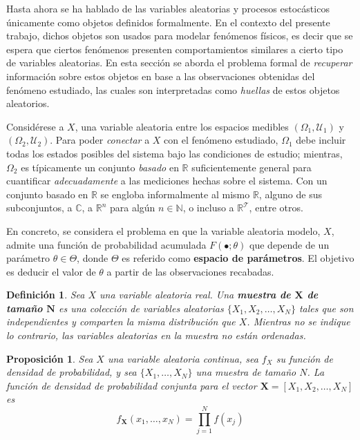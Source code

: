 \documentclass[12pt,letterpaper]{book}
\newtheorem{definicion}{Definición}[chapter]
\newtheorem{proposicion}[teorema]{Proposición}
\newcommand{\R}{\mathbb{R}}
\newcommand{\C}{\mathbb{C}}
\newcommand{\N}{\mathbb{N}}
\begin{document}
Hasta ahora se ha hablado de las variables aleatorias y procesos estocásticos únicamente como objetos definidos formalmente.
%
En el contexto del presente trabajo, dichos objetos son usados para modelar fenómenos físicos, es decir que se espera que ciertos fenómenos presenten comportamientos similares a cierto tipo de variables aleatorias.
%
En esta sección se aborda el problema formal de \textit{recuperar} información sobre estos objetos en base a las observaciones obtenidas del fenómeno estudiado, las cuales son interpretadas como \textit{huellas} de estos objetos aleatorios.

Considérese a $X$, una variable aleatoria entre los espacios medibles $(\Omega_1,\mathcal{U}_1)$ y $(\Omega_2,\mathcal{U}_2)$. 
%
Para poder \textit{conectar} a $X$ con el fenómeno estudiado, $\Omega_1$ debe incluir todas los estados posibles del sistema bajo las condiciones de estudio; mientras, $\Omega_2$ es típicamente un conjunto \textit{basado} en $\R$ suficientemente general para cuantificar \textit{adecuadamente} a las mediciones hechas sobre el sistema.
%
Con un conjunto basado en $\R$ se engloba informalmente al mismo $\R$, alguno de sus subconjuntos, a $\C$, a $\R^n$ para algún $n\in \N$, o incluso a $\R^\mathcal{T}$, entre otros.

En concreto, se considera el problema en que la variable aleatoria modelo, $X$, admite una función de probabilidad acumulada $F(\bullet; \theta)$ que depende de un parámetro $\theta \in \Theta$, donde $\Theta$ es referido como \textbf{espacio de parámetros}.
%
El objetivo es deducir el valor de $\theta$ a partir de las observaciones recabadas.

\begin{definicion}
Sea $X$ una variable aleatoria real. Una \textbf{muestra de $\boldsymbol{X}$ de tamaño $\boldsymbol{N}$} es una colección de variables aleatorias $\{ X_1, X_2, \dots, X_N \}$ tales que son independientes y comparten la misma distribución que $X$.
%
Mientras no se indique lo contrario, las variables aleatorias en la muestra no están ordenadas.
\end{definicion}

\begin{proposicion}
Sea $X$ una variable aleatoria continua, sea $f_X$ su función de densidad de probabilidad, y sea $\{ X_1, \dots, X_N \}$ una muestra de tamaño $N$. 
%
La función de densidad de probabilidad conjunta para el vector $\boldsymbol{X}=[ X_1, X_2, \dots, X_N ]$ es
\begin{equation}
f_{\boldsymbol{X}}(x_1, \dots, x_N ) = \prod_{j=1}^{N} f(x_j)
\end{equation}
\label{oculto1}
\end{proposicion}
\end{document}
